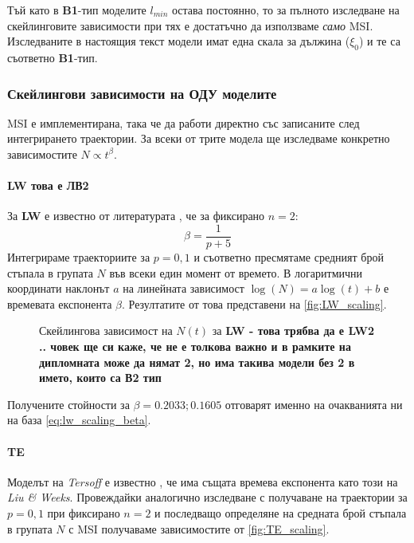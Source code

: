 Тъй като в \textbf{B1}-тип моделите $l_{min}$ остава постоянно, то за пълното изследване на скейлинговите зависимости при тях е достатъчно да използваме \textit{само} MSI. Изследваните в настоящия текст модели имат една скала за дължина ($\xi_0$) \cite{Staneva2010} и те са съответно \textbf{B1}-тип.

\subsubsection{Скейлингови зависимости на ОДУ моделите}
MSI е имплементирана, така че да работи директно със записаните след интегрирането траектории. За всеки от трите модела ще изследваме конкретно зависимостите $N \propto t^\beta$. 

\paragraph{LW това е ЛВ2} За \textbf{LW} е известно от литературата \cite{Liu1998} \cite{Krasteva2016}, че за фиксирано $n = 2$:
\begin{equation}
    \beta = \frac{1}{p+5}
    \label{eq:lw_scaling_beta}
\end{equation} 
Интегрираме траекториите за $p = 0, 1$ и съответно пресмятаме средният брой стъпала в групата $N$ във всеки един момент от времето. В логаритмични координати наклонът $a$ на линейната зависимост $\log(N) = a \log(t) + b$ е времевата експонента $\beta$. Резултатите от това представени на \autoref{fig:LW_scaling}.
\begin{figure}[hbpt]
    \centering
    \caption{Скейлингова зависимост на $N(t)$ за \textbf{LW - това трябва да е LW2 .. човек ще си каже, че не е толкова важно и в рамките на дипломната може да нямат 2, но има такива модели без 2 в името, които са В2 тип}}
    \label{fig:LW_scaling}
\end{figure}
Получените стойности за $\beta = 0.2033; 0.1605$ отговарят именно на очакванията ни на база \autoref{eq:lw_scaling_beta}.

\paragraph{TE} Моделът на \textit{Tersoff} е известно \cite{Krasteva2016}, че има същата времева експонента като този на \textit{Liu \& Weeks}. Провеждайки аналогично изследване с получаване на траектории за $p = 0, 1$ при фиксирано $n =  2$ и последващо определяне на средната брой стъпала в групата $N$ с MSI получаваме зависимостите от \autoref{fig:TE_scaling}. 

